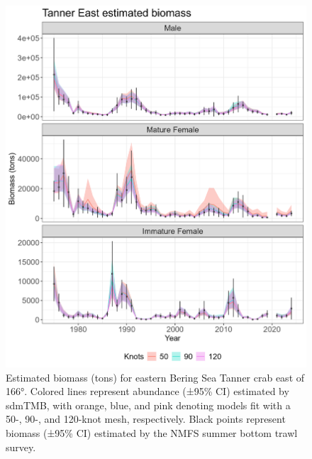 \documentclass[
]{article}
\begin{document}
\begin{figure}

{\centering \includegraphics[width=1\linewidth,height=1\textheight]{../BAIRDI/Figures/TannerEast.biomass.index} 

}

\caption{Estimated biomass (tons) for eastern Bering Sea Tanner crab east of 166°. Colored lines represent abundance (±95\% CI) estimated by sdmTMB, with orange, blue, and pink denoting models fit with a 50-, 90-, and 120-knot mesh, respectively. Black points represent biomass (±95\% CI) estimated by the NMFS summer bottom trawl survey.}\label{fig:Eastbairdi-bio-index}
\end{figure}
\end{document}
